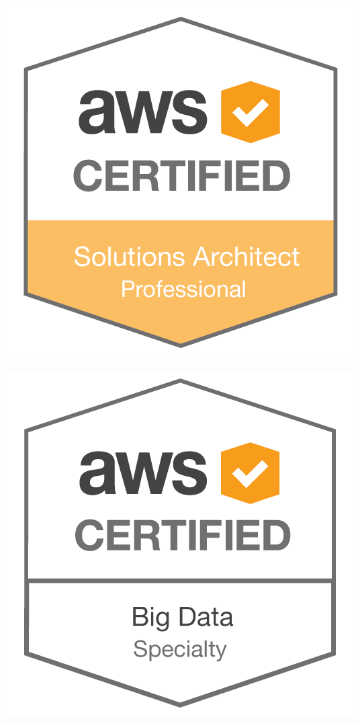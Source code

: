 \documentclass[]{cv-a4}
\begin{document}
\begin{figure}[h!]
  \centering
  \begin{subfigure}[b]{0.2\linewidth}
    \includegraphics[width=\linewidth]{images/SAP.png}
  \end{subfigure}
  \begin{subfigure}[b]{0.2\linewidth}
    \includegraphics[width=\linewidth]{images/BDS.png}
  \end{subfigure}
\end{figure}
\end{document}
